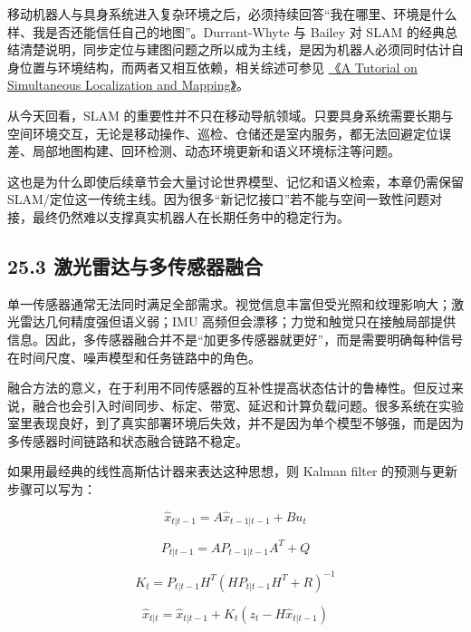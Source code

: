 移动机器人与具身系统进入复杂环境之后，必须持续回答“我在哪里、环境是什么样、我是否还能信任自己的地图”。Durrant-Whyte 与 Bailey 对 SLAM 的经典总结清楚说明，同步定位与建图问题之所以成为主线，是因为机器人必须同时估计自身位置与环境结构，而两者又相互依赖，相关综述可参见 \href{https://ieeexplore.ieee.org/document/1638022}{《A Tutorial on Simultaneous Localization and Mapping》}。

从今天回看，SLAM 的重要性并不只在移动导航领域。只要具身系统需要长期与空间环境交互，无论是移动操作、巡检、仓储还是室内服务，都无法回避定位误差、局部地图构建、回环检测、动态环境更新和语义环境标注等问题。

这也是为什么即使后续章节会大量讨论世界模型、记忆和语义检索，本章仍需保留 SLAM/定位这一传统主线。因为很多“新记忆接口”若不能与空间一致性问题对接，最终仍然难以支撑真实机器人在长期任务中的稳定行为。

\subsection*{25.3 激光雷达与多传感器融合}


单一传感器通常无法同时满足全部需求。视觉信息丰富但受光照和纹理影响大；激光雷达几何精度强但语义弱；IMU 高频但会漂移；力觉和触觉只在接触局部提供信息。因此，多传感器融合并不是“加更多传感器就更好”，而是需要明确每种信号在时间尺度、噪声模型和任务链路中的角色。

融合方法的意义，在于利用不同传感器的互补性提高状态估计的鲁棒性。但反过来说，融合也会引入时间同步、标定、带宽、延迟和计算负载问题。很多系统在实验室里表现良好，到了真实部署环境后失效，并不是因为单个模型不够强，而是因为多传感器时间链路和状态融合链路不稳定。

如果用最经典的线性高斯估计器来表达这种思想，则 Kalman filter 的预测与更新步骤可以写为：

\begin{equation*}
\hat{x}_{t|t-1} = A\hat{x}_{t-1|t-1} + Bu_t
\end{equation*}

\begin{equation*}
P_{t|t-1} = AP_{t-1|t-1}A^T + Q
\end{equation*}

\begin{equation*}
K_t = P_{t|t-1}H^T(HP_{t|t-1}H^T + R)^{-1}
\end{equation*}

\begingroup
\footnotesize
\begin{equation*}
\hat{x}_{t|t} = \hat{x}_{t|t-1} + K_t(z_t - H\hat{x}_{t|t-1})
\end{equation*}
\endgroup

